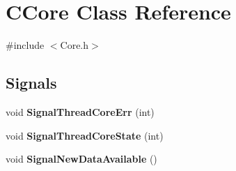 \hypertarget{classCCore}{
\section{CCore Class Reference}
\label{classCCore}
}


{\ttfamily \#include $<$Core.h$>$}\subsection*{Signals}
\begin{DoxyCompactItemize}
\item 
\hypertarget{classCCore_a511dd9be6e5a240b61bcab23bc70b322}{
void {\bfseries SignalThreadCoreErr} (int)}
\label{classCCore_a511dd9be6e5a240b61bcab23bc70b322}

\item 
\hypertarget{classCCore_a03dfcdbafa0ec6fd8d608c9b8136dde9}{
void {\bfseries SignalThreadCoreState} (int)}
\label{classCCore_a03dfcdbafa0ec6fd8d608c9b8136dde9}

\item 
\hypertarget{classCCore_a963de9336a447139f8961ed4790d4d8f}{
void {\bfseries SignalNewDataAvailable} ()}
\label{classCCore_a963de9336a447139f8961ed4790d4d8f}

\end{DoxyCompactItemize}
